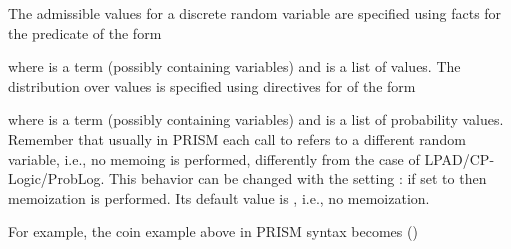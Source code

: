\documentclass[letterpaper,10pt,english]{sphinxmanual}
\begin{document}
The admissible values for a discrete random variable are specified using facts for the  predicate
of the form

\begin{sphinxVerbatim}[commandchars=\\\{\}]
\end{sphinxVerbatim}

where  is a term (possibly containing variables) and  is a list of values.
The distribution over values is specified using directives for  of the form

\begin{sphinxVerbatim}[commandchars=\\\{\}]
 
\end{sphinxVerbatim}

where  is a term (possibly containing variables) and  is a list of probability values.
Remember that usually in PRISM each call to  refers to a different random variable, i.e., no memoing is performed, differently from the case of LPAD/CP-Logic/ProbLog.
This behavior can be changed with the setting : if set to  then memoization is performed.
Its default value is , i.e., no memoization.

For example, the coin example above in PRISM syntax becomes ()
\end{document}
